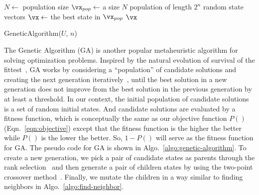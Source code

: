 \begin{algorithm}
        $N \leftarrow$ population size\;
	$\vx_{pop} \leftarrow$ a size $N$ population of length $2^{n}$ random state vectors\;
        $\vx \leftarrow$ the best state in $\vx_{pop}$   \;
	\Return $\vx$ \;
	\caption{GeneticAlgorithm($U$, $n$)}
\label{algo:genetic-algorithm}
\end{algorithm}

The Genetic Algorithm (GA) is another popular metaheuristic algorithm for solving optimization problems.
Inspired by the natural evolution of survival of the fittest~\cite{Holland_1992}, 
GA works by considering a ``population'' of candidate solutions and creating the
next generation iteratively~\cite{caitao2016}, until the best solution in a new generation does not
improve from the best solution in the previous generation by at least a threshold.
In our context, the initial population of candidate solutions is a set of random initial states. 
And candidate solutions are evaluated by a fitness function, which is conceptually the same as our 
objective function $P()$ (Eqn.~\ref{eqn:objective}) except that the fitness function is 
the higher the better while $P()$ is the lower the better.
So, $1-P()$ will serve as the fitness function for GA.
The pseudo code for GA is shown in Algo.~\ref{algo:genetic-algorithm}.
To create a new generation, we pick a pair of candidate states as parents through the 
rank selection~\cite{review-ga} and then generate a pair of children states by using the two-point 
crossover method~\cite{review-ga}. 
Finally, we mutate the children in a way similar to finding neighbors in Algo.~\ref{algo:find-neighbor}.

